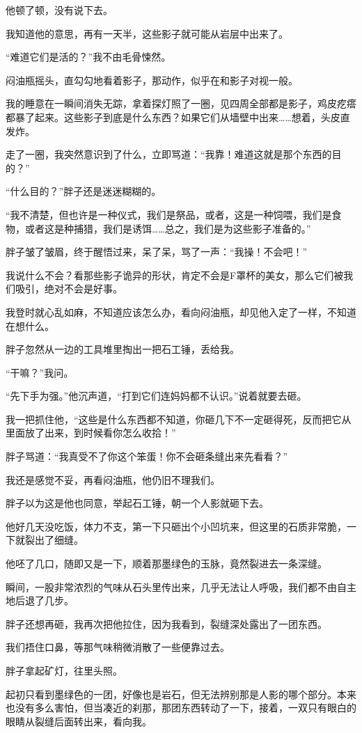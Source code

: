 他顿了顿，没有说下去。

我知道他的意思，再有一天半，这些影子就可能从岩层中出来了。

“难道它们是活的？”我不由毛骨悚然。

闷油瓶摇头，直勾勾地看着影子，那动作，似乎在和影子对视一般。

我的睡意在一瞬间消失无踪，拿着探灯照了一圈，见四周全部都是影子，鸡皮疙瘩都暴了起来。这些影子到底是什么东西？如果它们从墙壁中出来……想着，头皮直发炸。

走了一圈，我突然意识到了什么，立即骂道：“我靠！难道这就是那个东西的目的？”

“什么目的？”胖子还是迷迷糊糊的。

“我不清楚，但也许是一种仪式，我们是祭品，或者，这是一种饲喂，我们是食物，或者这是种捕猎，我们是诱饵……总之，我们是为这些影子准备的。”

胖子皱了皱眉，终于醒悟过来，呆了呆，骂了一声：“我操！不会吧！”

我说什么不会？看那些影子诡异的形状，肯定不会是F罩杯的美女，那么它们被我们吸引，绝对不会是好事。

我登时就心乱如麻，不知道应该怎么办，看向闷油瓶，却见他入定了一样，不知道在想什么。

胖子忽然从一边的工具堆里掏出一把石工锤，丢给我。

“干嘛？”我问。

“先下手为强。”他沉声道，“打到它们连妈妈都不认识。”说着就要去砸。

我一把抓住他，“这些是什么东西都不知道，你砸几下不一定砸得死，反而把它从里面放了出来，到时候看你怎么收拾！”

胖子骂道：“我真受不了你这个笨蛋！你不会砸条缝出来先看看？”

我还是感觉不妥，再看闷油瓶，他仍旧不理我们。

胖子以为这是他也同意，举起石工锤，朝一个人影就砸下去。

他好几天没吃饭，体力不支，第一下只砸出个小凹坑来，但这里的石质非常脆，一下就裂出了细缝。

他呸了几口，随即又是一下，顺着那墨绿色的玉脉，竟然裂进去一条深缝。

瞬间，一股非常浓烈的气味从石头里传出来，几乎无法让人呼吸，我们都不由自主地后退了几步。

胖子还想再砸，我再次把他拉住，因为我看到，裂缝深处露出了一团东西。

我们捂住口鼻，等那气味稍微消散了一些便靠过去。

胖子拿起矿灯，往里头照。

起初只看到墨绿色的一团，好像也是岩石，但无法辨别那是人影的哪个部分。本来也没有多么害怕，但当凑近的刹那，那团东西转动了一下，接着，一双只有眼白的眼睛从裂缝后面转出来，看向我。

